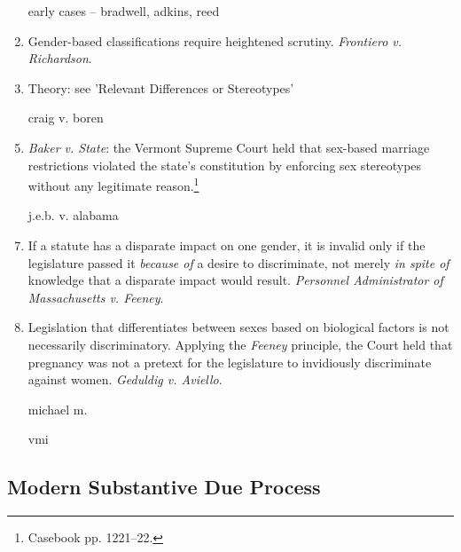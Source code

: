 \begin{enumerate}
    \item [early cases -- bradwell, adkins, reed] %
    \item Gender-based classifications require heightened scrutiny. 
    \emph{Frontiero v. Richardson}.
    \item Theory: see 'Relevant Differences or Stereotypes' %
    \item [craig v. boren] %
    \item \emph{Baker v. State}: the Vermont Supreme Court 
    held that sex-based marriage restrictions violated the state's 
    constitution by enforcing sex stereotypes without any legitimate 
    reason.\footnote{Casebook pp. 1221--22.}
    \item [j.e.b. v. alabama] %
    \item If a statute has a disparate impact on one gender, it is invalid 
    only if the legislature passed it \emph{because of} a desire to 
    discriminate, not merely \emph{in spite of} knowledge that a disparate 
    impact would result. \emph{Personnel Administrator of Massachusetts v. 
    Feeney}.
    \item Legislation that differentiates between sexes based on biological 
    factors is not necessarily discriminatory. Applying the \emph{Feeney} 
    principle, the Court held that pregnancy was not a pretext for the 
    legislature to invidiously discriminate against women. \emph{Geduldig v. 
    Aviello}.
    \item [michael m.] %
    \item [vmi] %
\end{enumerate}

\subsection{Modern Substantive Due Process}


